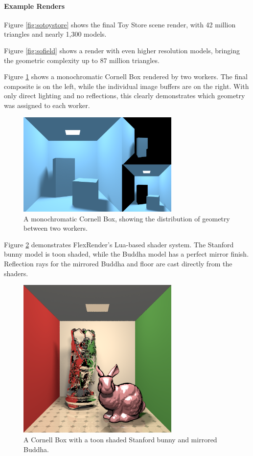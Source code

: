\documentclass[a4paper,twoside]{article}
\begin{document}
\paragraph{Example Renders}
Figure \ref{fig:sotoystore} shows the final Toy Store scene render, with 42 million
triangles and nearly 1,300 models.



Figure \ref{fig:sofield} shows a render with even higher resolution models,
bringing the geometric complexity up to 87 million triangles.



Figure \ref{fig:sodist} shows a monochromatic Cornell Box rendered by two workers.
The final composite is on the left, while the individual image buffers are on the right.
With only direct lighting and no reflections, this clearly demonstrates which
geometry was assigned to each worker.

\begin{figure}[h!]
    \centering
    \includegraphics[width=80mm]{showoff/distribution.png}

    \caption{A monochromatic Cornell Box, showing the distribution of geometry between two workers.}
    \label{fig:sodist}
\end{figure}

Figure \ref{fig:socornell} demonstrates FlexRender's Lua-based shader system. The
Stanford bunny model is toon shaded, while the Buddha model has a perfect mirror
finish. Reflection rays for the mirrored Buddha and floor are cast directly
from the shaders.

\begin{figure}[h!]
    \centering
    \includegraphics[width=80mm]{showoff/cornell-models.png}
    \caption{A Cornell Box with a toon shaded Stanford bunny and mirrored Buddha.}
    \label{fig:socornell}
\end{figure}
\end{document}
